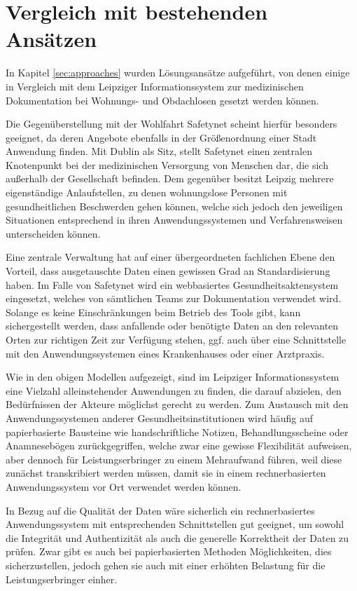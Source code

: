 \section{Vergleich mit bestehenden Ansätzen}\label{sec:compare}

In Kapitel \ref{sec:approaches} wurden Lösungsansätze aufgeführt, von denen einige in Vergleich mit dem Leipziger Informationssystem zur medizinischen Dokumentation bei Wohnungs- und Obdachlosen gesetzt werden können.

Die Gegenüberstellung mit der Wohlfahrt Safetynet scheint hierfür besonders geeignet, da deren Angebote ebenfalls in der Größenordnung einer Stadt Anwendung finden. Mit Dublin als Sitz, stellt Safetynet einen zentralen Knotenpunkt bei der medizinischen Versorgung von Menschen dar, die sich außerhalb der Gesellschaft befinden. Dem gegenüber besitzt Leipzig mehrere eigenständige Anlaufstellen, zu denen wohnungslose Personen mit gesundheitlichen Beschwerden gehen können, welche sich jedoch den jeweiligen Situationen entsprechend in ihren Anwendungssystemen und Verfahrensweisen unterscheiden können.

Eine zentrale Verwaltung hat auf einer übergeordneten fachlichen Ebene den Vorteil, dass ausgetauschte Daten einen gewissen Grad an Standardisierung haben. Im Falle von Safetynet wird ein webbasiertes Gesundheitsaktensystem eingesetzt, welches von sämtlichen Teams zur Dokumentation verwendet wird. Solange es keine Einschränkungen beim Betrieb des Tools gibt, kann sichergestellt werden, dass anfallende oder benötigte Daten an den relevanten Orten zur richtigen Zeit zur Verfügung stehen, ggf. auch über eine Schnittstelle mit den Anwendungssystemen eines Krankenhauses oder einer Arztpraxis.

Wie in den obigen Modellen aufgezeigt, sind im Leipziger Informationssystem eine Vielzahl alleinstehender Anwendungen zu finden, die darauf abzielen, den Bedürfnissen der Akteure möglichst gerecht zu werden. Zum Austausch mit den Anwendungssystemen anderer Gesundheitsinstitutionen wird häufig auf papierbasierte Bausteine wie handschriftliche Notizen, Behandlungsscheine oder Anamnesebögen zurückgegriffen, welche zwar eine gewisse Flexibilität aufweisen, aber dennoch für Leistungserbringer zu einem Mehraufwand führen, weil diese zunächst transkribiert werden müssen, damit sie in einem rechnerbasierten Anwendungssystem vor Ort verwendet werden können.

In Bezug auf die Qualität der Daten wäre sicherlich ein rechnerbasiertes Anwendungssystem mit entsprechenden Schnittstellen gut geeignet, um sowohl die Integrität und Authentizität als auch die generelle Korrektheit der Daten zu prüfen. Zwar gibt es auch bei papierbasierten Methoden Möglichkeiten, dies sicherzustellen, jedoch gehen sie auch mit einer erhöhten Belastung für die Leistungserbringer einher.

